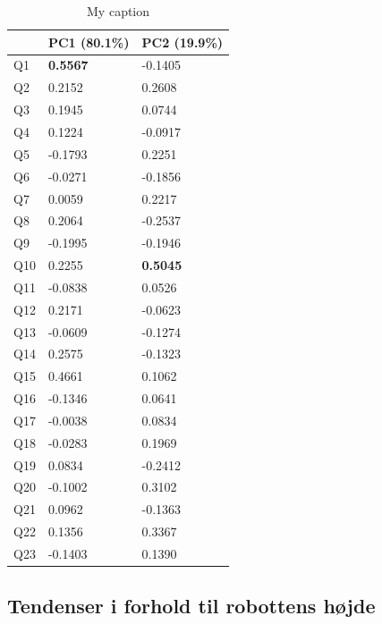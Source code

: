 \begin{table}[H]
\centering
\caption{My caption}
\label{my-label}
\begin{tabular}{l|l|l}
    & PC1 (80.1\%)    & PC2 (19.9\%)    \\ \hline
Q1  & \textbf{0.5567} & -0.1405         \\ \hline
Q2  & 0.2152          & 0.2608          \\ \hline
Q3  & 0.1945          & 0.0744          \\ \hline
Q4  & 0.1224          & -0.0917         \\ \hline
Q5  & -0.1793         & 0.2251          \\ \hline
Q6  & -0.0271         & -0.1856         \\ \hline
Q7  & 0.0059          & 0.2217          \\ \hline
Q8  & 0.2064          & -0.2537         \\ \hline
Q9  & -0.1995         & -0.1946         \\ \hline
Q10 & 0.2255          & \textbf{0.5045} \\ \hline
Q11 & -0.0838         & 0.0526          \\ \hline
Q12 & 0.2171          & -0.0623         \\ \hline
Q13 & -0.0609         & -0.1274         \\ \hline
Q14 & 0.2575          & -0.1323         \\ \hline
Q15 & 0.4661          & 0.1062          \\ \hline
Q16 & -0.1346         & 0.0641          \\ \hline
Q17 & -0.0038         & 0.0834          \\ \hline
Q18 & -0.0283         & 0.1969          \\ \hline
Q19 & 0.0834          & -0.2412         \\ \hline
Q20 & -0.1002         & 0.3102          \\ \hline
Q21 & 0.0962          & -0.1363         \\ \hline
Q22 & 0.1356          & 0.3367          \\ \hline
Q23 & -0.1403         & 0.1390         
\end{tabular}
\end{table}

\subsection{Tendenser i forhold til robottens højde}
\label{DatabehandlingRHeightTendenser}
%







